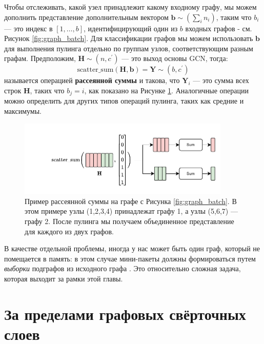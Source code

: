 Чтобы отслеживать, какой узел принадлежит какому входному графу, мы можем дополнить представление дополнительным вектором $\mathbf{b} \sim (\sum_i n_i)$, таким что $b_i$ — это индекс в $[1, \ldots, b]$, идентифицирующий один из $b$ входных графов - см. Рисунок \ref{fig:graph_batch}. Для классификации графов мы можем использовать $\mathbf{b}$ для выполнения пулинга отдельно по группам узлов, соответствующим разным графам. Предположим, $\mathbf{H} \sim (n,c^\prime)$ — это выход основы GCN, тогда:
%
\begin{equation}
\text{scatter\_sum}\left(\mathbf{H}, \mathbf{b}\right) = \mathbf{Y} \sim (b, c^\prime)
\label{eq:scatter_sum}
\end{equation}
%
называется операцией \textbf{рассеянной суммы} и такова, что $\mathbf{Y}_i$ — это сумма всех строк $\mathbf{H}$, таких что $b_j = i$, как показано на Рисунке \ref{fig:scatter_sum}. Аналогичные операции можно определить для других типов операций пулинга, таких как средние и максимумы.

\begin{figure}[t]
    \centering
    \includegraphics[width=0.9\textwidth]{images/graphs-Pagina-5}\hspace*{5em}
    \caption{Пример рассеянной суммы на графе с Рисунка \ref{fig:graph_batch}. В этом примере узлы (1,2,3,4) принадлежат графу 1, а узлы (5,6,7) — графу 2. После пулинга мы получаем объединенное представление для каждого из двух графов.}
    \label{fig:scatter_sum}
\end{figure}

В качестве отдельной проблемы, иногда у нас может быть один граф, который не помещается в память: в этом случае мини-пакеты должны формироваться путем \textit{выборки} подграфов из исходного графа \cite{hamilton2017inductive}. Это относительно сложная задача, которая выходит за рамки этой главы.

\section{За пределами графовых свёрточных слоев}

